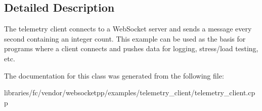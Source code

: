 \subsection{Detailed Description}
The telemetry client connects to a Web\+Socket server and sends a message every second containing an integer count. This example can be used as the basis for programs where a client connects and pushes data for logging, stress/load testing, etc. 

The documentation for this class was generated from the following file\+:\begin{DoxyCompactItemize}
\item 
libraries/fc/vendor/websocketpp/examples/telemetry\+\_\+client/telemetry\+\_\+client.\+cpp\end{DoxyCompactItemize}
